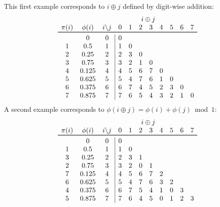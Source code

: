 \documentclass[12pt]{amsart}
\begin{document}
This first example corresponds to $i \oplus j$ defined by digit-wise addition:
\[
\begin{array}{ccc|cccccccc}
&& \multicolumn{9}{c}{i \oplus j} \\
 \pi(i) & \phi(i) & \multicolumn{1}{c}{i\backslash j} & 0 & 1 & 2 & 3 & 4 & 5 & 6 & 7 \\ 
    \toprule
      & 0 & 0 & 0\\
    1 & 0.5 & 1 & 1 & 0 \\
    2 & 0.25  & 2 & 2 & 3 & 0\\
    3 & 0.75  & 3 & 3 & 2 & 1 & 0\\
    4 & 0.125 & 4 & 4 & 5 & 6 & 7 & 0\\
    5 & 0.625 & 5 & 5 & 4 & 7 & 6 & 1 & 0\\
    6 & 0.375 & 6 & 6 & 7 & 4 & 5 & 2 & 3 & 0\\
    7 & 0.875 & 7 & 7 & 6 & 5 & 4 & 3 & 2 & 1 & 0\\
\end{array}
\]
A second example corresponds to $\phi(i \oplus j) = \phi(i) + \phi(j) \bmod 1$:
\[
\begin{array}{ccc|ccccccccc}
&& \multicolumn{9}{c}{i \oplus j} \\
 \pi(i) & \phi(i) & \multicolumn{1}{c}{i\backslash j} & 0 & 1 & 2 & 3 & 4 & 5 & 6 & 7 \\ 
    \toprule
      & 0 &     0 & 0\\
    1 & 0.5   & 1 & 1 & 0 \\
    3 & 0.25  & 2 & 2 & 3 & 1\\
    2 & 0.75  & 3 & 3 & 2 & 0 & 1\\
    7 & 0.125 & 4 & 4 & 5 & 6 & 7 & 2\\
    6 & 0.625 & 5 & 5 & 4 & 7 & 6 & 3 & 2\\
    4 & 0.375 & 6 & 6 & 7 & 5 & 4 & 1 & 0 & 3\\
    5 & 0.875 & 7 & 7 & 6 & 4 & 5 & 0 & 1 & 2 & 3\\
\end{array}
\]
\end{document}
